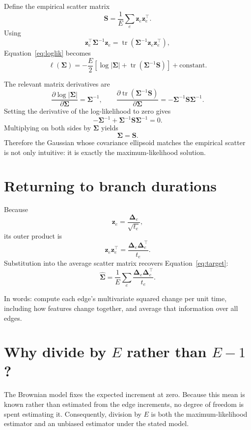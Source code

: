 \documentclass[10pt]{article}
\newcommand{\tr}{\operatorname{tr}}
\begin{document}
Define the empirical scatter matrix
\[
  \mathbf S=\frac{1}{E}\sum_e\mathbf z_e\mathbf z_e^\top.
\]
Using
\[
  \mathbf z_e^\top\boldsymbol\Sigma^{-1}\mathbf z_e
  =\tr\!\left(\boldsymbol\Sigma^{-1}
               \mathbf z_e\mathbf z_e^\top\right),
\]
Equation~\eqref{eq:loglik} becomes
\[
  \ell(\boldsymbol\Sigma)
  =-\frac{E}{2}\left[
      \log|\boldsymbol\Sigma|
      +\tr(\boldsymbol\Sigma^{-1}\mathbf S)
    \right]+\text{constant}.
\]

The relevant matrix derivatives are
\[
 \frac{\partial\log|\boldsymbol\Sigma|}{\partial\boldsymbol\Sigma}
 =\boldsymbol\Sigma^{-1},
 \qquad
 \frac{\partial\tr(\boldsymbol\Sigma^{-1}\mathbf S)}
      {\partial\boldsymbol\Sigma}
 =-\boldsymbol\Sigma^{-1}\mathbf S\boldsymbol\Sigma^{-1}.
\]
Setting the derivative of the log-likelihood to zero gives
\[
 -\boldsymbol\Sigma^{-1}
 +\boldsymbol\Sigma^{-1}\mathbf S\boldsymbol\Sigma^{-1}=0.
\]
Multiplying on both sides by $\boldsymbol\Sigma$ yields
\[
  \boxed{\boldsymbol\Sigma=\mathbf S.}
\]
Therefore the Gaussian whose covariance ellipsoid matches the empirical
scatter is not only intuitive: it is exactly the maximum-likelihood solution.

\section{Returning to branch durations}

Because
\[
  \mathbf z_e=\frac{\boldsymbol\Delta_e}{\sqrt{t_e}},
\]
its outer product is
\[
  \mathbf z_e\mathbf z_e^\top
  =\frac{\boldsymbol\Delta_e\boldsymbol\Delta_e^\top}{t_e}.
\]
Substitution into the average scatter matrix recovers Equation~\eqref{eq:target}:
\[
  \boxed{
  \widehat{\boldsymbol\Sigma}
  =\frac{1}{E}\sum_e
    \frac{\boldsymbol\Delta_e\boldsymbol\Delta_e^\top}{t_e}.}
\]

In words: compute each edge's multivariate squared change per unit time,
including how features change together, and average that information over all
edges.

\section{Why divide by $E$ rather than $E-1$?}

The Brownian model fixes the expected increment at zero.  Because this mean is
known rather than estimated from the edge increments, no degree of freedom is
spent estimating it.  Consequently, division by $E$ is both the
maximum-likelihood estimator and an unbiased estimator under the stated model.
\end{document}
